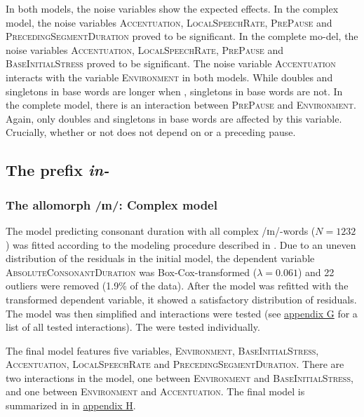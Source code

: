  In both models, the noise variables show the expected effects. In the complex model, the noise variables \textsc{Accentuation}, \textsc{LocalSpeechRate}, \textsc{PrePause} and \textsc{PrecedingSegmentDuration} proved to be significant. In the complete mo-del, the noise variables \textsc{Accentuation}, \textsc{LocalSpeechRate}, \textsc{PrePause} and \textsc{BaseInitialStress} proved to be significant.
 The noise variable \textsc{Accentuation} interacts with the variable \textsc{Environment} in both models. While doubles and singletons in base words are longer when , singletons in base words are not. In the complete model, there is an interaction between \textsc{PrePause} and \textsc{Environment}. Again, only doubles and singletons in base words are affected by this variable. Crucially,  whether   or not does not depend on  or a preceding pause. 


\subsection{The prefix \textit{in-}} \label{in experiment}

\subsubsection{The allomorph /ɪn/: Complex model}

The model predicting consonant duration with all complex /ɪn/-words ($N=1232$) was fitted according to the modeling procedure described in . Due to an uneven distribution of the residuals in the initial model, the dependent variable \textsc{AbsoluteConsonantDuration} was Box-Cox-transformed ($\lambda = 0.061$) and 22 outliers were removed (1.9\% of the data).
After the model was refitted with the transformed dependent variable, it showed a satisfactory distribution of residuals.  The model was then simplified and interactions were tested (see \hyperref[Appendix G Summaries of tested interactions in experimental study]{appendix G} for a list of all tested interactions).
The  were tested individually.

The final model features five variables, \textsc{Environment}, \textsc{BaseInitialStress}, \textsc{Accentuation}, \textsc{LocalSpeechRate} and \textsc{PrecedingSegmentDuration}. 
There are two interactions in the model, one between \textsc{Environment} and \textsc{BaseInitialStress}, and one between \textsc{Environment} and \textsc{Accentuation}. The final model is summarized in  in \hyperref[Appendix H: Model Summaries Experiment]{appendix H}.


